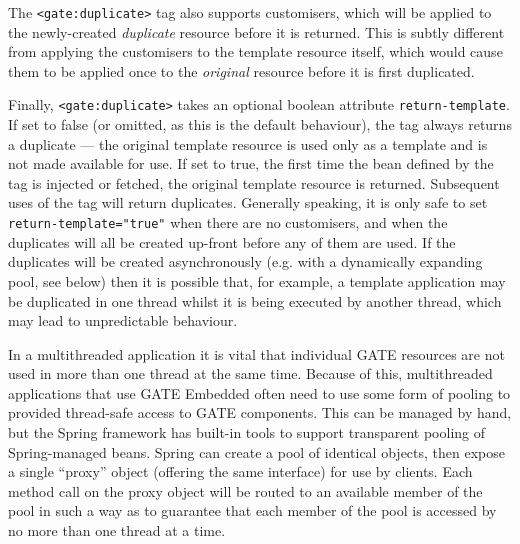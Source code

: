 The \verb|<gate:duplicate>| tag also supports customisers, which will be
applied to the newly-created \emph{duplicate} resource before it is returned.
This is subtly different from applying the customisers to the template resource
itself, which would cause them to be applied once to the \emph{original}
resource before it is first duplicated.

Finally, \verb|<gate:duplicate>| takes an optional boolean attribute
\verb|return-template|.  If set to false (or omitted, as this is the default
behaviour), the tag always returns a duplicate --- the original template
resource is used only as a template and is not made available for use.  If set
to true, the first time the bean defined by the tag is injected or fetched, the
original template resource is returned.  Subsequent uses of the tag will return
duplicates.  Generally speaking, it is only safe to set
\verb|return-template="true"| when there are no customisers, and when the
duplicates will all be created up-front before any of them are used.  If the
duplicates will be created asynchronously (e.g. with a dynamically expanding
pool, see below) then it is possible that, for example, a template application
may be duplicated in one thread whilst it is being executed by another thread,
which may lead to unpredictable behaviour.


In a multithreaded application it is vital that individual GATE resources are
not used in more than one thread at the same time.  Because of this,
multithreaded applications that use GATE Embedded often need to use some form
of pooling to provided thread-safe access to GATE components.  This can be
managed by hand, but the Spring framework has built-in tools to support
transparent pooling of Spring-managed beans.  Spring can create a pool of
identical objects, then expose a single ``proxy'' object (offering the same
interface) for use by clients.  Each method call on the proxy object will be
routed to an available member of the pool in such a way as to guarantee that
each member of the pool is accessed by no more than one thread at a time.

